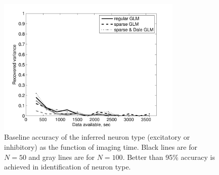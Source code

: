 \begin{figure}[h]
	\centering
\includegraphics[width=250pt]{../figs/Figure11_inhexc_errors}
\caption{Baseline accuracy of the inferred neuron type (excitatory or inhibitory) as the function of imaging time. Black lines are for $N=50$ and gray lines are for $N=100$. Better than 95\% accuracy
is achieved in identification of neuron type.}
\label{fig:data-ie}
\end{figure}